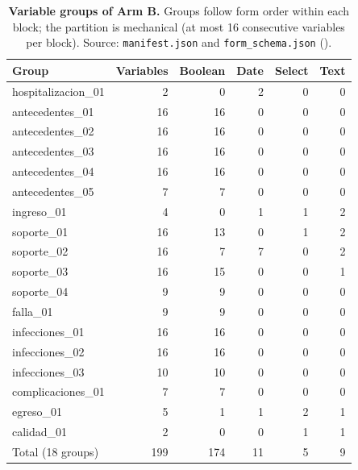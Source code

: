 \begin{table}[tbp]
\centering\small
\caption{\textbf{Variable groups of Arm B.} Groups follow form order within each block; the partition is
mechanical (at most 16 consecutive variables per block). Source: \texttt{manifest.json} and
\texttt{form\_schema.json} (\formv{}).}
\label{tab:groups}
\begin{tabular}{lrrrrr}
\toprule
Group & Variables & Boolean & Date & Select & Text \\
\midrule
hospitalizacion\_01 & 2 & 0 & 2 & 0 & 0 \\
antecedentes\_01 & 16 & 16 & 0 & 0 & 0 \\
antecedentes\_02 & 16 & 16 & 0 & 0 & 0 \\
antecedentes\_03 & 16 & 16 & 0 & 0 & 0 \\
antecedentes\_04 & 16 & 16 & 0 & 0 & 0 \\
antecedentes\_05 & 7 & 7 & 0 & 0 & 0 \\
ingreso\_01 & 4 & 0 & 1 & 1 & 2 \\
soporte\_01 & 16 & 13 & 0 & 1 & 2 \\
soporte\_02 & 16 & 7 & 7 & 0 & 2 \\
soporte\_03 & 16 & 15 & 0 & 0 & 1 \\
soporte\_04 & 9 & 9 & 0 & 0 & 0 \\
falla\_01 & 9 & 9 & 0 & 0 & 0 \\
infecciones\_01 & 16 & 16 & 0 & 0 & 0 \\
infecciones\_02 & 16 & 16 & 0 & 0 & 0 \\
infecciones\_03 & 10 & 10 & 0 & 0 & 0 \\
complicaciones\_01 & 7 & 7 & 0 & 0 & 0 \\
egreso\_01 & 5 & 1 & 1 & 2 & 1 \\
calidad\_01 & 2 & 0 & 0 & 1 & 1 \\
\midrule
Total (18 groups) & 199 & 174 & 11 & 5 & 9 \\
\bottomrule
\end{tabular}
\end{table}


